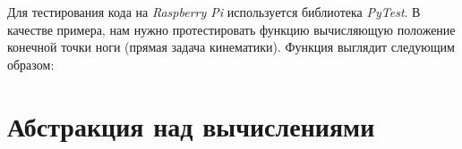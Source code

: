 Для тестирования кода на \textit{Raspberry Pi} используется библиотека \textit{PyTest}. В качестве примера, нам нужно протестировать функцию вычисляющую положение конечной точки ноги (прямая задача кинематики). Функция выглядит следующим образом:
\begin{python}
    
\end{python}

\section{Абстракция над вычислениями}
